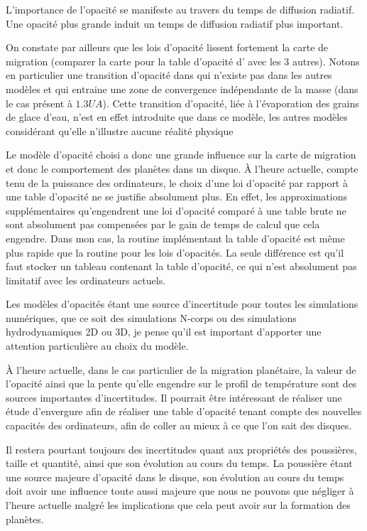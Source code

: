 L'importance de l'opacité se manifeste au travers du temps de diffusion radiatif. Une opacité plus grande induit un temps de
diffusion radiatif plus important. 

On constate par ailleurs que les lois d'opacité lissent fortement la carte de migration (comparer la carte pour la table
d'opacité d'\cite{hure2000transition} avec les 3 autres). Notons en particulier une transition d'opacité dans \cite{bell1994FU}
qui n'existe pas dans les autres modèles et qui entraine une zone de convergence indépendante de la masse (dans le cas présent
à $1.3\unit{UA}$). Cette transition d'opacité, liée à l'évaporation des grains de glace d'eau, n'est en effet introduite que
dans ce modèle, les autres modèles considérant qu'elle n'illustre aucune réalité physique 

Le modèle d'opacité choisi a donc une grande influence sur la carte de migration et donc le comportement des planètes dans un
disque. À l'heure actuelle, compte tenu de la puissance des ordinateurs, le choix d'une loi d'opacité par rapport à une table
d'opacité ne se justifie absolument plus. En effet, les approximations supplémentaires qu'engendrent une loi d'opacité comparé
à une table brute ne sont absolument pas compensées par le gain de temps de calcul que cela engendre. Dans mon cas, la routine
implémentant la table d'opacité est même plus rapide que la routine pour les lois d'opacités. La seule différence est qu'il
faut stocker un tableau contenant la table d'opacité, ce qui n'est absolument pas limitatif avec les ordinateurs actuels.

Les modèles d'opacités étant une source d'incertitude pour toutes les simulations numériques, que ce soit des simulations
N-corps ou des simulations hydrodynamiques 2D ou 3D, je pense qu'il est important d'apporter une attention particulière au
choix du modèle. 

À l'heure actuelle, dans le cas particulier de la migration planétaire, la valeur de l'opacité ainsi que la pente qu'elle
engendre sur le profil de température sont des sources importantes d'incertitudes. Il pourrait être intéressant de réaliser une
étude d'envergure afin de réaliser une table d'opacité tenant compte des nouvelles capacités des ordinateurs, afin de coller au
mieux à ce que l'on sait des disques. 

Il restera pourtant toujours des incertitudes quant aux propriétés des poussières, taille et quantité, ainsi que son évolution
au cours du temps. La poussière étant une source majeure d'opacité dans le disque, son évolution au cours du temps doit avoir
une influence toute aussi majeure que nous ne pouvons que négliger à l'heure actuelle malgré les implications que cela peut
avoir sur la formation des planètes.

